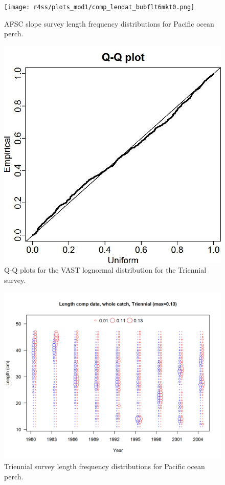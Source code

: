 \documentclass[12pt,]{article}
\begin{document}
\FloatBarrier

\begin{figure}
\centering
\texttt{[image: r4ss/plots\_mod1/comp\_lendat\_bubflt6mkt0.png]}
\caption{AFSC slope survey length frequency distributions for Pacific
ocean perch. \label{fig:afsc_Length}}
\end{figure}

\FloatBarrier

\begin{figure}
\centering
\includegraphics{Figures/Q-Q_plot_triennial.jpg}
\caption{Q-Q plots for the VAST lognormal distribution for the Triennial
survey. \label{fig:tri_qq}}
\end{figure}

\FloatBarrier

\begin{figure}
\centering
\includegraphics{r4ss/plots_mod1/comp_lendat_bubflt5mkt0.png}
\caption{Triennial survey length frequency distributions for Pacific
ocean perch. \label{fig:Tri_Length}}
\end{figure}
\end{document}

